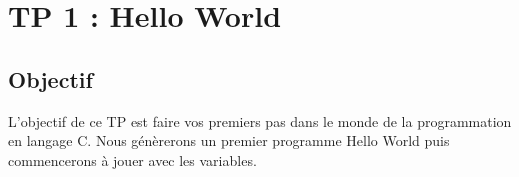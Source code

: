 
\section{TP 1 : Hello World}
\subsection{Objectif}
L'objectif de ce TP est faire vos premiers pas dans le monde de la programmation en langage C. Nous génèrerons un premier programme Hello World puis commencerons à jouer avec les variables.






